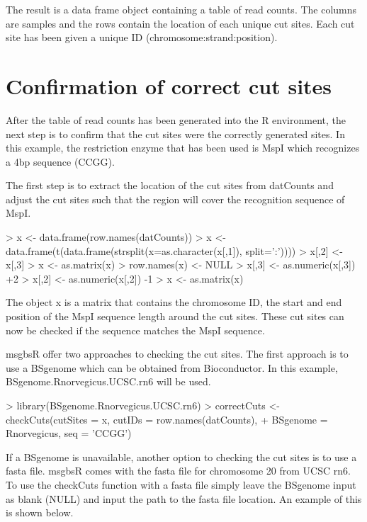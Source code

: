 \documentclass{article}
\begin{document}
The result is a data frame object containing a table of read counts. The columns are samples and the rows contain the location of each unique cut sites. Each cut site has been given a unique ID (chromosome:strand:position).

\section{Confirmation of correct cut sites}

After the table of read counts has been generated into the R environment, the next step is to confirm that the cut sites were the correctly generated sites. In this example, the restriction enzyme that has been used is MspI which recognizes a 4bp sequence (CCGG).

The first step is to extract the location of the cut sites from datCounts and adjust the cut sites such that the region will cover the recognition sequence of MspI.

\begin{Schunk}
\begin{Sinput}
> x <- data.frame(row.names(datCounts))
> x <- data.frame(t(data.frame(strsplit(x=as.character(x[,1]), split=':'))))
> x[,2] <- x[,3]
> x <- as.matrix(x)
> row.names(x) <- NULL
> x[,3] <- as.numeric(x[,3]) +2
> x[,2] <- as.numeric(x[,2]) -1
> x <- as.matrix(x)
\end{Sinput}
\end{Schunk}

The object x is a matrix that contains the chromosome ID, the start and end position of the MspI sequence length around the cut sites. These cut sites can now be checked if the sequence matches the MspI sequence.

msgbsR offer two approaches to checking the cut sites. The first approach is to use a BSgenome which can be obtained from Bioconductor. In this example, BSgenome.Rnorvegicus.UCSC.rn6 will be used.

\begin{Schunk}
\begin{Sinput}
> library(BSgenome.Rnorvegicus.UCSC.rn6)
> correctCuts <- checkCuts(cutSites = x, cutIDs = row.names(datCounts),
+                          BSgenome = Rnorvegicus, seq = 'CCGG')
\end{Sinput}
\end{Schunk}

If a BSgenome is unavailable, another option to checking the cut sites is to use a fasta file. msgbsR comes with the fasta file for chromosome 20 from UCSC rn6. To use the checkCuts function with a fasta file simply leave the BSgenome input as blank (NULL) and input the path to the fasta file location. An example of this is shown below.
\end{document}
